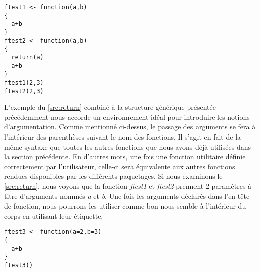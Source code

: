 \begin{lstlisting}[caption = L'instruction \emph{return} et le retour standard d'une fonction R ,label=src:return]
ftest1 <- function(a,b)
{
  a+b
}
ftest2 <- function(a,b)
{
  return(a)
  a+b
}
ftest1(2,3)
ftest2(2,3)
\end{lstlisting}

\vspace{\baselineskip}
L'exemple du \autoref{src:return} combiné à la structure générique présentée précédemment nous accorde un environnement idéal pour introduire les notions d'argumentation. Comme mentionné ci-dessus, le passage des arguments se fera à l'intérieur des parenthèses suivant le nom des fonctions. Il s'agit en fait de la même syntaxe que toutes les autres fonctions que nous avons déjà utilisées dans la section précédente. En d'autres mots, une fois une fonction utilitaire définie correctement par l'utilisateur, celle-ci sera équivalente aux autres fonctions rendues disponibles par les différents paquetages. Si nous examinons le \autoref{src:return}, nous voyons que la fonction \emph{ftest1} et \emph{ftest2} prennent 2 paramètres à titre d'arguments nommés \emph{a} et \emph{b}. Une fois les arguments déclarés dans l'en-tête de fonction, nous pourrons les utiliser comme bon nous semble à l'intérieur du corps en utilisant leur étiquette.

\begin{lstlisting}[caption = Définir des valeurs par défauts dans les fonctions utilitaires,label=src:defaultParams]
ftest3 <- function(a=2,b=3)
{
  a+b
}
ftest3()
\end{lstlisting}

